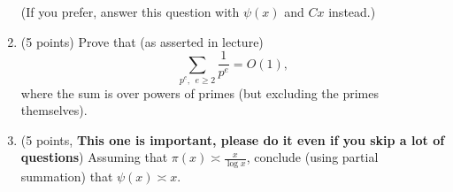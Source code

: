 \documentclass[12pt]{article}
\begin{document}
\begin{enumerate}
(If you prefer, answer this question with $\psi(x)$ and $C x$ instead.)

\item (5 points)
Prove that (as asserted in lecture)
\begin{equation}
\sum_{p^e, \ \ e \geq 2} \frac{1}{p^e} = O(1),
\end{equation}
where the sum is over powers of primes (but excluding the primes themselves).

\item
(5 points, {\bf This one is important, please do it even if you skip a lot of questions}) 
Assuming that $\pi(x) \asymp \frac{x}{\log x}$, conclude (using partial summation) that $\psi(x) \asymp x$.
\end{enumerate}
\end{document}

